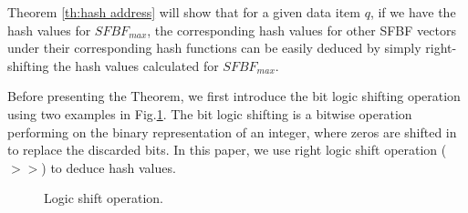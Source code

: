 \documentclass[10pt,journal,compsoc]{IEEEtran}
\begin{document}
Theorem \ref{th:hash address} will show that for a given data item $q$, if we have the hash values for $SFBF_{max}$,
 the corresponding hash values for other SFBF vectors under their corresponding hash functions can be easily deduced by simply right-shifting the hash values calculated for $SFBF_{max}$.

Before presenting the Theorem, we first introduce the bit logic shifting operation using two examples in Fig.\ref{fig:Logic shift operation}. The bit logic shifting is a bitwise operation performing on the binary representation of an integer, where zeros are shifted in to replace the discarded bits. In this paper, we use right logic shift operation ($>>$) to deduce hash values.


\begin{figure}[!h]
\centering
{}
\caption{Logic shift operation.}
\label{fig:Logic shift operation}
\end{figure}
\end{document}
